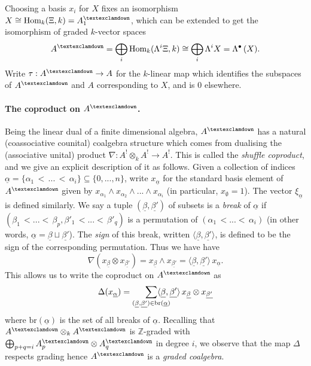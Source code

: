 \documentclass[a4paper]{article}
\theoremstyle{definition}
\theoremstyle{remark}
\newcommand{\exterior}{\ensuremath{\Lambda^\bullet\,}}
\newcommand{\Hom}{\ensuremath{\text{Hom}}}
\newcommand{\gnab}{{\textexclamdown}}
\begin{document}
Choosing a basis \(x_i\) for \(X\) fixes an isomorphism \(X\cong\Hom_k(\Xi,
k)=A^\gnab_1\), which can be extended to get the isomorphism of graded \(k\)-vector
spaces
\[A^\gnab = \bigoplus_i \Hom_k(\Lambda^i\Xi, k) \cong \bigoplus_i \Lambda^i X =
\exterior(X).\] 
Write \(\tau:A^\gnab \rightarrow A\) for the \(k\)-linear map which identifies
the subspaces of \(A^\gnab\) and \(A\) corresponding to \(X\), and is \(0\)
elsewhere. 


\paragraph{The coproduct on \(A^\gnab\).}
Being the linear dual of a finite dimensional algebra, \(A^\gnab\) has a natural
(coassociative counital) coalgebra structure which comes from dualising the
(associative unital) product \({\nabla: A^!\otimes_k A^!\rightarrow A^!}\). This
is called the \textit{shuffle coproduct}, and we give an explicit description of
it as follows. Given a collection of indices \(\underline{\alpha}=\{\alpha_1\,<\,
...\,<\,\alpha_i\}\subseteq \{0,...,n\}\), write \(x_{\underline{\alpha}}\) for the
standard basis element of \(A^\gnab\) given by \({x_{\alpha_1}\wedge
x_{\alpha_2} \wedge ... \wedge x_{\alpha_i}}\) (in particular,
\(x_\emptyset = 1\)). The vector \(\xi_{\underline{\alpha}}\) is defined
similarly. We say a tuple \((\underline{\beta}, \underline{\beta'})\) of subsets
is a \textit{break} of \(\underline{\alpha}\) if \((\beta_1\,<...<\,\beta_p,
\beta'_1\,<...<\,\beta'_q)\) is a permutation of \((\alpha_1\,<...<\,
\alpha_i)\) (in other words, \(\underline{\alpha} = \underline{\beta} \sqcup
\underline{\beta'}\)). The \textit{sign} of this break, written \(\langle
\underline{\beta}, \underline{\beta'}\rangle\), is defined to be the sign of the
corresponding permutation. Thus we have have 
\[\nabla(x_{\underline{\beta}} \otimes
    x_{\underline{\beta'}})=x_{\underline{\beta}} \wedge
    x_{\underline{\beta'}}=\langle \underline{\beta}, \underline{\beta'}\rangle
\, x_{\underline{\alpha}}.\] 
This allows us to write the coproduct on \(A^\gnab\) as 
\[\Delta(x_{\underline{\alpha}}) =
    \smashoperator[r]{\sum\limits_{(\underline{\beta},\underline{\beta'})\in
    \text{br}(\underline{\alpha})}} \langle \underline{\beta},
\underline{\beta'}\rangle \, x_{\underline{\beta}} \otimes
x_{\underline{\beta'}}\]
where \(\text{br}(\underline{\alpha})\) is the set of all breaks of
\(\underline{\alpha}\).  Recalling that \(A^\gnab\otimes_k A^\gnab\) is
\(\mathbb{Z}\)-graded with \(\bigoplus_{p+q=i}A^\gnab_p\otimes A^\gnab_q\) in
degree \(i\), we observe that the map \(\Delta\) respects grading hence
\(A^\gnab\) is a \textit{graded coalgebra}.
\end{document}
